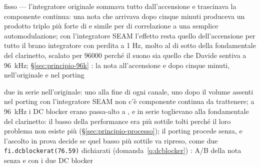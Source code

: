 {fisso}
{---}
{l'integratore originale sommava tutto dall'accensione e trascinava la componente continua: una nota che arrivava dopo cinque minuti produceva un prodotto triplo più forte di  e simile per  di correlazione a una semplice automodulazione; con l'integratore SEAM l'effetto resta quello dell'accensione per tutto il brano}
{integratore con perdita a 1 Hz, molto al di sotto della fondamentale del clarinetto, scalato per 96000 perché il suono sia quello che Davide sentiva a \qty{96}{\kilo\hertz}; \S\ref{sec:principio-96k}}
{\deciso}
{: la nota all'accensione e dopo cinque minuti, nell'originale e nel porting}

{due in serie nell'originale: uno alla fine di ogni canale, uno dopo il volume}
{assenti nel porting}
{con l'integratore SEAM non c'è componente continua da trattenere; a \qty{96}{\kilo\hertz} i DC blocker erano passa-alto a , e in serie toglievano  alla fondamentale del clarinetto: il basso della performance era più sottile}
{tolti perché il loro problema non esiste più (\S\ref{sec:principio-processo}); il porting procede senza, e l'ascolto in prova decide se quel basso più sottile va ripreso, come due \texttt{fi.dcblockerat(76.59)} dichiarati (domanda~\ref{q:dcblocker})}
{\daprovare}
{: A/B della nota senza e con i due DC blocker}
